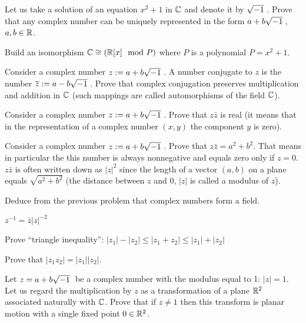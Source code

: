 \documentclass[12pt]{article}
\begin{document}
\begin{zadacha} Let us take a solution of an equation $x^2+1$ in ${\mathbb C}$
  and denote it by $\sqrt{-1}\:$. Prove that any complex number can be uniquely
  represented in the form $a + b \sqrt{-1}\:$, $a,b \in {\mathbb R}$.
\end{zadacha}

\begin{zadacha}
Build an isomorphism ${\mathbb C} \cong ({\mathbb R}[x] \mod P)$ where $P$ is a polynomial
$P= x^2+1$.
\end{zadacha}

\begin{zadacha} Consider a complex number $z:=a+b\sqrt{-1}\:$. A number conjugate
to $z$ is the number $\overline z := a-b\sqrt{-1}\:$. Prove that complex conjugation
preserves multiplication and addition in ${\mathbb C}$ (such mappings are
called automorphisms of the field ${\mathbb C}$).
\end{zadacha}

\begin{zadacha} Consider a complex number $z:=a+b\sqrt{-1}\:$. Prove that 
$z\bar z$ is real (it means that in the representation of a complex
  number $(x,y)$ the component $y$ is zero).
\end{zadacha}

\begin{zadacha} Consider a complex number $z:=a+b\sqrt{-1}\:$. Prove that $z\bar z = a^2
+ b^2$. That means in particular the this number is always nonnegative and
equals zero only if $z = 0$. $z\bar z$ is often written down as $|z|^2$ since
the length of a vector $(a,b)$ on a plane equals $\sqrt{a^2 + b^2}$ (the
distance between $z$ and $0$, $|z|$ is called a modulus of $z$).
\end{zadacha}

\begin{zadacha} 
Deduce from the previous problem that complex numbers form a field.
\end{zadacha}

\begin{ukazanie} $z^{-1} = \bar z |z|^{-2}$
\end{ukazanie}

\begin{zadacha} Prove ``triangle inequality'': 
$|z_1| - |z_2| \leq |z_1 + z_2| \leq |z_1|+ |z_2|$
\end{zadacha}

\begin{zadacha} Prove that $|z_1 z_2| = |z_1||z_2|$.
\end{zadacha}

\begin{zadacha}[!]\label{povorot}
Let $z=a+b\sqrt{-1}\:$ be a complex number with the modulus equal to 1:
$|z|=1$. Let us regard the multiplication by $z$ as a transformation
of a plane ${\mathbb R}^2$ associated naturally with ${\mathbb C}$. Prove that if $z
\neq 1$ then this transform is planar motion with a single fixed point
$0 \in {\mathbb R}^2$.
\end{zadacha}
\end{document}
